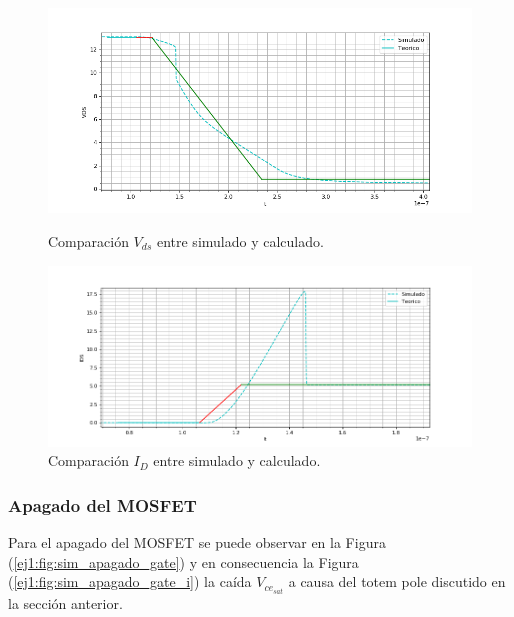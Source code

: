 \begin{figure}[H]
	\centering
	\begin{minipage}{0.5\textwidth}
		\centering
		\includegraphics[width=1.1\textwidth]{ImagenesEjercicio-1/sim_encendido_drain} %
		\caption{Comparación $V_{ds}$ entre simulado y calculado.}
		\label{ej1:fig:sim_encendido_drain}
	\end{minipage}\hfill
	\begin{minipage}{0.5\textwidth}
		\centering
		\includegraphics[width=1.1\textwidth]{ImagenesEjercicio-1/sim_encendido_drain_i} %
		\caption{Comparación $I_{D}$ entre simulado y calculado.}
		\label{ej1:fig:sim_encendido_drain_i}
	\end{minipage}
\end{figure}



\subsubsection{Apagado del MOSFET}

Para el apagado del MOSFET se puede observar en la Figura (\ref{ej1:fig:sim_apagado_gate}) y en consecuencia la Figura (\ref{ej1:fig:sim_apagado_gate_i}) la caída $V_{ce_{sat}}$ a causa del totem pole discutido en la sección anterior.

